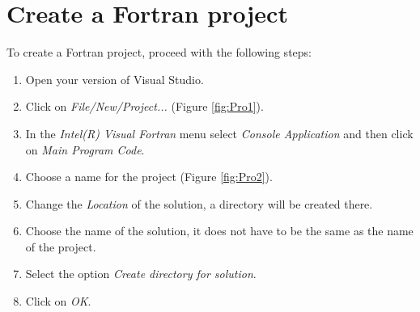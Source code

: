 %
%
%
%



    \FloatBarrier
    \section{Create a Fortran project}

To create a Fortran project, proceed with the following steps: 

\begin{enumerate}
    \item Open your version of Visual Studio.
    \item Click on \textit{File/New/Project...} (Figure \ref{fig:Pro1}).
    \item In the \textit{Intel(R) Visual Fortran} menu select \textit{Console Application} and then click on \textit{Main Program Code}.
    \item Choose a name for the project (Figure \ref{fig:Pro2}). 
    \item Change the \textit{Location} of the solution, a directory will be created there.
    \item Choose the name of the solution, it does not have to be the same as the name of the project.  
    \item Select the option \textit{Create directory for solution}.
    \item Click on \textit{OK}.
\end{enumerate}


